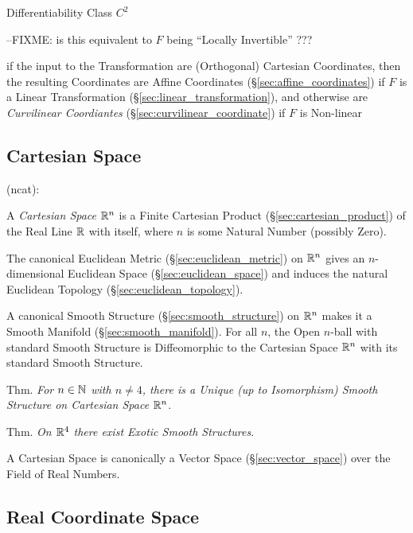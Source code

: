 Differentiability Class $C^2$

--FIXME: is this equivalent to $F$ being ``Locally Invertible'' ???

if the input to the Transformation are (Orthogonal) Cartesian Coordinates, then
the resulting Coordinates are Affine Coordinates
(\S\ref{sec:affine_coordinates}) if $F$ is a Linear Transformation
(\S\ref{sec:linear_transformation}), and otherwise are \emph{Curvilinear
  Coordiantes} (\S\ref{sec:curvilinear_coordinate}) if $F$ is Non-linear



\subsection{Cartesian Space}\label{sec:cartesian_space}

(ncat):

A \emph{Cartesian Space} $\mathbb{R}^n$ is a Finite Cartesian Product
(\S\ref{sec:cartesian_product}) of the Real Line $\mathbb{R}$ with itself, where
$n$ is some Natural Number (possibly Zero).

The canonical Euclidean Metric (\S\ref{sec:euclidean_metric}) on $\mathbb{R}^n$
gives an $n$-dimensional Euclidean Space (\S\ref{sec:euclidean_space}) and
induces the natural Euclidean Topology (\S\ref{sec:euclidean_topology}).

A canonical Smooth Structure (\S\ref{sec:smooth_structure}) on $\mathbb{R}^n$ makes
it a Smooth Manifold (\S\ref{sec:smooth_manifold}). For all $n$, the Open
$n$-ball with standard Smooth Structure is Diffeomorphic to the Cartesian Space
$\mathbb{R}^n$ with its standard Smooth Structure.

Thm. \emph{For $n \in \mathbb{N}$ with $n \neq 4$, there is a Unique (up to
  Isomorphism) Smooth Structure on Cartesian Space $\mathbb{R}^n$}.

Thm. \emph{On $\mathbb{R}^4$ there exist Exotic Smooth Structures}.

A Cartesian Space is canonically a Vector Space (\S\ref{sec:vector_space}) over
the Field of Real Numbers.



\subsection{Real Coordinate Space}\label{sec:real_coordinate_space}

